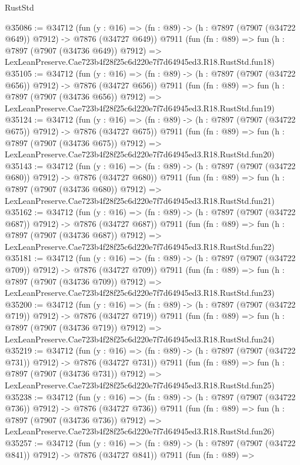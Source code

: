 \begin{lexlean}{RustStd}
\begin{coremodule}
@35086 := @34712
    (fun (y : @16) => (fn : @89) -> (h : @7897 (@7907 (@34722 @649)) @7912) -> @7876 (@34727 @649))
    @7911
    (fun (fn : @89) =>
    fun (h : @7897 (@7907 (@34736 @649)) @7912) =>
    LexLeanPreserve.Cae723b4f28f25c6d220e7f7d64945ed3.R18.RustStd.fun18)
@35105 := @34712
    (fun (y : @16) => (fn : @89) -> (h : @7897 (@7907 (@34722 @656)) @7912) -> @7876 (@34727 @656))
    @7911
    (fun (fn : @89) =>
    fun (h : @7897 (@7907 (@34736 @656)) @7912) =>
    LexLeanPreserve.Cae723b4f28f25c6d220e7f7d64945ed3.R18.RustStd.fun19)
@35124 := @34712
    (fun (y : @16) => (fn : @89) -> (h : @7897 (@7907 (@34722 @675)) @7912) -> @7876 (@34727 @675))
    @7911
    (fun (fn : @89) =>
    fun (h : @7897 (@7907 (@34736 @675)) @7912) =>
    LexLeanPreserve.Cae723b4f28f25c6d220e7f7d64945ed3.R18.RustStd.fun20)
@35143 := @34712
    (fun (y : @16) => (fn : @89) -> (h : @7897 (@7907 (@34722 @680)) @7912) -> @7876 (@34727 @680))
    @7911
    (fun (fn : @89) =>
    fun (h : @7897 (@7907 (@34736 @680)) @7912) =>
    LexLeanPreserve.Cae723b4f28f25c6d220e7f7d64945ed3.R18.RustStd.fun21)
@35162 := @34712
    (fun (y : @16) => (fn : @89) -> (h : @7897 (@7907 (@34722 @687)) @7912) -> @7876 (@34727 @687))
    @7911
    (fun (fn : @89) =>
    fun (h : @7897 (@7907 (@34736 @687)) @7912) =>
    LexLeanPreserve.Cae723b4f28f25c6d220e7f7d64945ed3.R18.RustStd.fun22)
@35181 := @34712
    (fun (y : @16) => (fn : @89) -> (h : @7897 (@7907 (@34722 @709)) @7912) -> @7876 (@34727 @709))
    @7911
    (fun (fn : @89) =>
    fun (h : @7897 (@7907 (@34736 @709)) @7912) =>
    LexLeanPreserve.Cae723b4f28f25c6d220e7f7d64945ed3.R18.RustStd.fun23)
@35200 := @34712
    (fun (y : @16) => (fn : @89) -> (h : @7897 (@7907 (@34722 @719)) @7912) -> @7876 (@34727 @719))
    @7911
    (fun (fn : @89) =>
    fun (h : @7897 (@7907 (@34736 @719)) @7912) =>
    LexLeanPreserve.Cae723b4f28f25c6d220e7f7d64945ed3.R18.RustStd.fun24)
@35219 := @34712
    (fun (y : @16) => (fn : @89) -> (h : @7897 (@7907 (@34722 @731)) @7912) -> @7876 (@34727 @731))
    @7911
    (fun (fn : @89) =>
    fun (h : @7897 (@7907 (@34736 @731)) @7912) =>
    LexLeanPreserve.Cae723b4f28f25c6d220e7f7d64945ed3.R18.RustStd.fun25)
@35238 := @34712
    (fun (y : @16) => (fn : @89) -> (h : @7897 (@7907 (@34722 @736)) @7912) -> @7876 (@34727 @736))
    @7911
    (fun (fn : @89) =>
    fun (h : @7897 (@7907 (@34736 @736)) @7912) =>
    LexLeanPreserve.Cae723b4f28f25c6d220e7f7d64945ed3.R18.RustStd.fun26)
@35257 := @34712
    (fun (y : @16) => (fn : @89) -> (h : @7897 (@7907 (@34722 @841)) @7912) -> @7876 (@34727 @841))
    @7911
    (fun (fn : @89) =>

\end{coremodule}
\end{lexlean}
